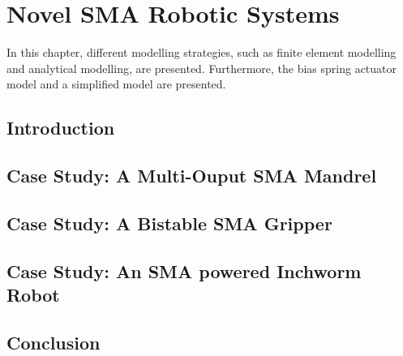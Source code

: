 
\chapter{Novel SMA Robotic Systems}
In this chapter, different modelling strategies, such as finite element modelling and analytical modelling, are presented. Furthermore, the bias spring actuator model and a simplified model are presented.
\section{Introduction}
\section{Case Study: A Multi-Ouput SMA Mandrel}
\section{Case Study: A Bistable SMA Gripper}
\section{Case Study: An SMA powered Inchworm Robot}
\section{Conclusion}
